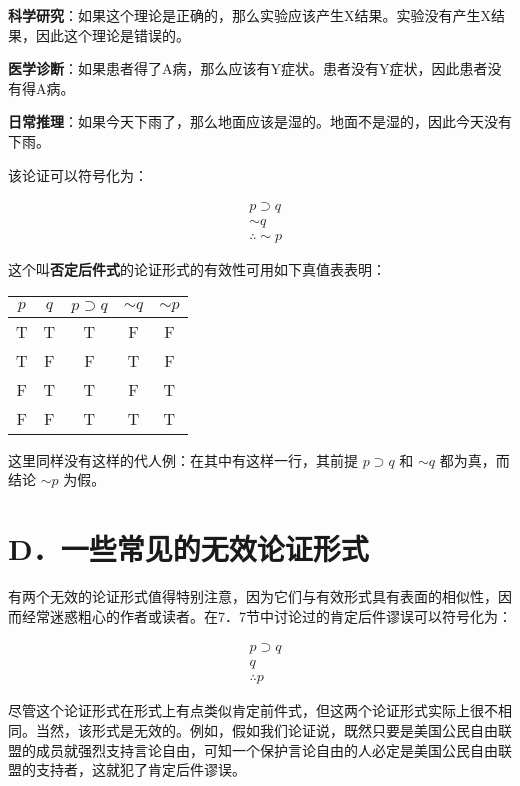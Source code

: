 \begin{examplebox}[title=否定后件式在不同领域的应用]
\textbf{科学研究}：如果这个理论是正确的，那么实验应该产生X结果。实验没有产生X结果，因此这个理论是错误的。

\textbf{医学诊断}：如果患者得了A病，那么应该有Y症状。患者没有Y症状，因此患者没有得A病。

\textbf{日常推理}：如果今天下雨了，那么地面应该是湿的。地面不是湿的，因此今天没有下雨。
\end{examplebox}

该论证可以符号化为：

$$
\begin{aligned}
& p \supset q \\
& \sim q \\
& \therefore \sim p
\end{aligned}
$$

这个叫\textbf{否定后件式}的论证形式的有效性可用如下真值表表明：

\begin{center}
\begin{tabular}{|ccccc|}
\hline
$p$ & $q$ & $p \supset q$ & $\sim q$ & $\sim p$ \\
\hline
T & T & T & F & F \\
T & F & F & T & F \\
F & T & T & F & T \\
F & F & T & T & T \\
\hline
\end{tabular}
\end{center}

这里同样没有这样的代人例：在其中有这样一行，其前提 $p \supset q$ 和 $\sim q$ 都为真，而结论 $\sim p$ 为假。

\section*{D．一些常见的无效论证形式}
有两个无效的论证形式值得特别注意，因为它们与有效形式具有表面的相似性，因而经常迷惑粗心的作者或读者。在7．7节中讨论过的肯定后件谬误可以符号化为：

$$
\begin{aligned}
& p \supset q \\
& q \\
& \therefore p
\end{aligned}
$$

尽管这个论证形式在形式上有点类似肯定前件式，但这两个论证形式实际上很不相同。当然，该形式是无效的。例如，假如我们论证说，既然只要是美国公民自由联盟的成员就强烈支持言论自由，可知一个保护言论自由的人必定是美国公民自由联盟的支持者，这就犯了肯定后件谬误。

